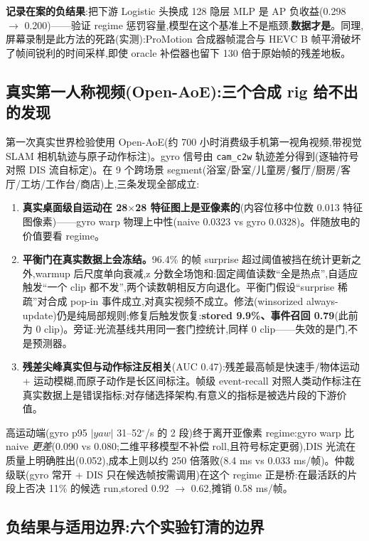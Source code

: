 \documentclass[UTF8,12pt,a4paper]{ctexart}
\begin{document}
\textbf{记录在案的负结果}:把下游 Logistic 头换成 128 隐层 MLP 是 AP 负收益(0.298 $\to$ 0.200)——验证 regime 惩罚容量,模型在这个基准上不是瓶颈,\textbf{数据才是}。同理,屏幕录制是此方法的死路(实测):ProMotion 合成器帧混合与 HEVC B 帧平滑破坏了帧间锐利的时间采样,即使 oracle 补偿器也留下 130 倍于原始帧的残差地板。

\subsection{真实第一人称视频(Open-AoE):三个合成 rig 给不出的发现}

第一次真实世界检验使用 Open-AoE\cite{openaoe}(约 700 小时消费级手机第一视角视频,带视觉 SLAM 相机轨迹与原子动作标注)。gyro 信号由 \texttt{cam\_c2w} 轨迹差分得到(逐轴符号对照 DIS 流自标定)。在 9 个跨场景 segment(浴室/卧室/儿童房/餐厅/厨房/客厅/工坊/工作台/商店)上,三条发现全部成立:

\begin{enumerate}
  \item \textbf{真实桌面级自运动在 28$\times$28 特征图上是亚像素的}(内容位移中位数 0.013 特征图像素)——gyro warp 物理上中性(naive 0.0323 vs gyro 0.0328)。伴随放电的价值要看 regime。
  \item \textbf{平衡门在真实数据上会冻结。}96.4\% 的帧 surprise 超过阈值被挡在统计更新之外,warmup 后尺度单向衰减,z 分数全场饱和:固定阈值读数``全是热点'',自适应触发``一个 clip 都不发'',两个读数朝相反方向退化。平衡门假设``surprise 稀疏''对合成 pop-in 事件成立,对真实视频不成立。修法(winsorized always-update)仍是纯局部规则;修复后触发恢复:\textbf{stored 9.9\%、事件召回 0.79}(此前为 0 clip)。旁证:光流基线共用同一套门控统计,同样 0 clip——失效的是门,不是预测器。
  \item \textbf{残差尖峰真实但与动作标注反相关}(AUC 0.47):残差最高帧是快速手/物体运动 + 运动模糊,而原子动作是长区间标注。帧级 event-recall 对照人类动作标注在真实数据上是错误指标;对存储选择架构,有意义的指标是被选片段的下游价值。
\end{enumerate}

高运动端(gyro p95 $|yaw|$ 31--52$^\circ$/s 的 2 段)终于离开亚像素 regime:gyro warp 比 naive \emph{更差}(0.090 vs 0.080;二维平移模型不补偿 roll,且符号标定更弱),DIS 光流在质量上明确胜出(0.052),成本上则以约 250 倍落败(8.4 ms vs 0.033 ms/帧)。仲裁级联(gyro 常开 + DIS 只在候选帧按需调用)在这个 regime 正是桥:在最活跃的片段上否决 11\% 的候选 run,stored 0.92 $\to$ 0.62,摊销 0.58 ms/帧。

\subsection{负结果与适用边界:六个实验钉清的边界}
\end{document}
